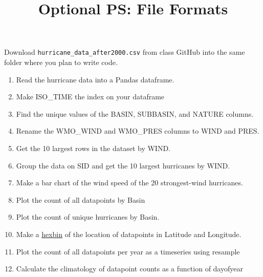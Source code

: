 \documentclass{article}
\title{\vspace{-1in} Optional PS: File Formats}
\newcommand{\be}{\begin{enumerate}}
\newcommand{\ee}{\end{enumerate}}
\begin{document}
\maketitle

Download \texttt{hurricane\_data\_after2000.csv} from class GitHub into the same folder where you plan to write code.

\be
\item Read the hurricane data into a Pandas dataframe.

\item Make ISO\_TIME the index on your dataframe

\item Find the unique values of the BASIN, SUBBASIN, and NATURE columns.

\item Rename the WMO\_WIND and WMO\_PRES columns to WIND and PRES.

\item Get the 10 largest rows in the dataset by WIND.

\item Group the data on SID and get the 10 largest hurricanes by WIND.

\item Make a bar chart of the wind speed of the 20 strongest-wind hurricanes.

\item Plot the count of all datapoints by Basin

\item Plot the count of unique hurricanes by Basin.

\item Make a \href{https://pandas.pydata.org/docs/reference/api/pandas.DataFrame.plot.hexbin.html}{hexbin} of the location of datapoints in Latitude and Longitude.

\item Plot the count of all datapoints per year as a timeseries using resample

\item Calculate the climatology of datapoint counts as a function of dayofyear

\ee
\end{document}
